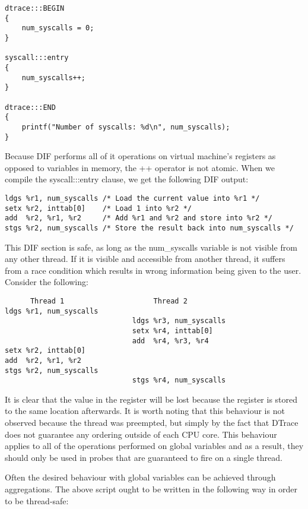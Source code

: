 \begin{verbatim}
dtrace:::BEGIN
{
    num_syscalls = 0;
}

syscall:::entry
{
    num_syscalls++;
}

dtrace:::END
{
    printf("Number of syscalls: %d\n", num_syscalls);
}
\end{verbatim}

\noindent
Because DIF performs all of it operations on virtual machine's registers as
opposed to variables in memory, the ++ operator is not atomic. When we compile
the syscall:::entry clause, we get the following DIF output:

\begin{verbatim}
ldgs %r1, num_syscalls /* Load the current value into %r1 */
setx %r2, inttab[0]    /* Load 1 into %r2 */
add  %r2, %r1, %r2     /* Add %r1 and %r2 and store into %r2 */
stgs %r2, num_syscalls /* Store the result back into num_syscalls */
\end{verbatim}

\noindent
This DIF section is safe, as long as the num\_syscalls variable is not visible
from any other thread. If it is visible and accessible from another thread, it
suffers from a race condition which results in wrong information being given to
the user. Consider the following:

\begin{verbatim}
      Thread 1                     Thread 2
ldgs %r1, num_syscalls
                              ldgs %r3, num_syscalls
                              setx %r4, inttab[0]
                              add  %r4, %r3, %r4
setx %r2, inttab[0]
add  %r2, %r1, %r2
stgs %r2, num_syscalls
                              stgs %r4, num_syscalls
\end{verbatim}

\noindent
It is clear that the value in the  register will be lost because
the register  is stored to the same location afterwards. It is
worth noting that this behaviour is not observed because the thread was
preempted, but simply by the fact that DTrace does not guarantee any ordering
outside of each CPU core. This behaviour applies to all of the operations
performed on global variables and as a result, they should only be used in
probes that are guaranteed to fire on a single thread.

\noindent
Often the desired behaviour with global variables can be achieved through
aggregations. The above script ought to be written in the following way in order
to be thread-safe:

